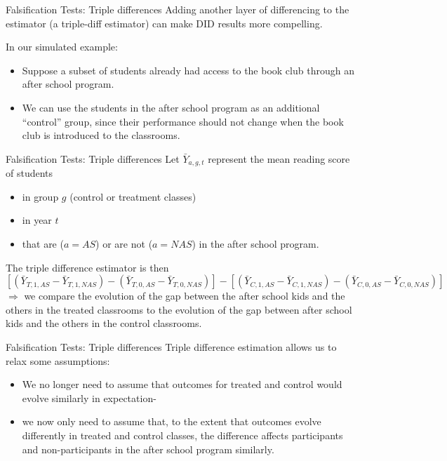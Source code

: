 \documentclass[
  ignorenonframetext,
]{beamer}
\begin{document}
\begin{frame}{Falsification Tests: Triple differences}
\protect\hypertarget{falsification-tests-triple-differences}{}
Adding another layer of differencing to the estimator (a triple-diff
estimator) can make DID results more compelling.

In our simulated example:

\begin{itemize}
\item
  Suppose a subset of students already had access to the book club
  through an after school program.
\item
  We can use the students in the after school program as an additional
  ``control'' group, since their performance should not change when the
  book club is introduced to the classrooms.
\end{itemize}
\end{frame}

\begin{frame}{Falsification Tests: Triple differences}
\protect\hypertarget{falsification-tests-triple-differences-1}{}
Let \(\bar{Y}_{a,g,t}\) represent the mean reading score of students

\begin{itemize}
\item
  in group \(g\) (control or treatment classes)
\item
  in year \(t\)
\item
  that are (\(a=AS\)) or are not (\(a=NAS\)) in the after school
  program.
\end{itemize}

The triple difference estimator is then \footnotesize \[
[(\bar{Y}_{T,1,AS}-\bar{Y}_{T,1,NAS})-(\bar{Y}_{T,0,AS}-\bar{Y}_{T,0,NAS})]-[(\bar{Y}_{C,1, AS}-\bar{Y}_{C,1, NAS})-(\bar{Y}_{C,0,AS}-\bar{Y}_{C,0,NAS})]
\] \normalsize \(\Rightarrow\) we compare the evolution of the gap
between the after school kids and the others in the treated classrooms
to the evolution of the gap between after school kids and the others in
the control classrooms.
\end{frame}

\begin{frame}{Falsification Tests: Triple differences}
\protect\hypertarget{falsification-tests-triple-differences-2}{}
Triple difference estimation allows us to relax some assumptions:

\begin{itemize}
\item
  We no longer need to assume that outcomes for treated and control
  would evolve similarly in expectation-
\item
  we now only need to assume that, to the extent that outcomes evolve
  differently in treated and control classes, the difference affects
  participants and non-participants in the after school program
  similarly.
\end{itemize}
\end{frame}
\end{document}
